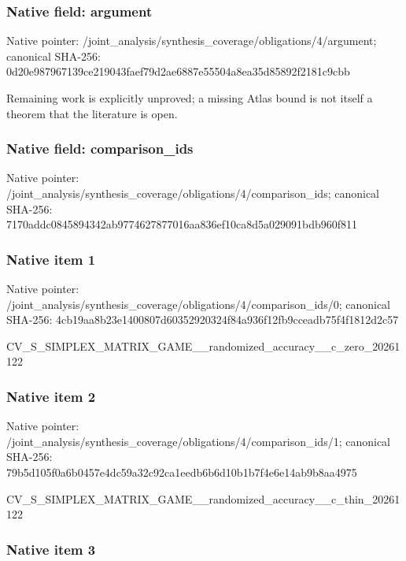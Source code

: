 \documentclass[10pt,a4paper]{article}
\begin{document}
\subsubsection{Native field: argument}


Native pointer: /joint\_analysis/synthesi\allowbreak{}s\_coverage/obligations/4\allowbreak{}/argument; canonical SHA-256: 0d20e987967139ce219043fa\allowbreak{}ef79d2ae6887e55504a8ea35\allowbreak{}d85892f2181c9cbb


Remaining work is explicitly unproved; a missing Atlas bound is not itself a theorem that the literature is open.


\subsubsection{Native field: comparison\_ids}


Native pointer: /joint\_analysis/synthesi\allowbreak{}s\_coverage/obligations/4\allowbreak{}/comparison\_ids; canonical SHA-256: 7170addc0845894342ab9774\allowbreak{}627877016aa836ef10ca8d5a\allowbreak{}029091bdb960f811



\subsubsection{Native item 1}


Native pointer: /joint\_analysis/synthesi\allowbreak{}s\_coverage/obligations/4\allowbreak{}/comparison\_ids/0; canonical SHA-256: 4cb19aa8b23e1400807d6035\allowbreak{}2920324f84a936f12fb9ccea\allowbreak{}db75f4f1812d2c57


CV\_S\_SIMPLEX\_MATRIX\_GAME\allowbreak{}\_\_randomized\_accuracy\_\_c\allowbreak{}\_zero\_20261122


\subsubsection{Native item 2}


Native pointer: /joint\_analysis/synthesi\allowbreak{}s\_coverage/obligations/4\allowbreak{}/comparison\_ids/1; canonical SHA-256: 79b5d105f0a6b0457e4dc59a\allowbreak{}32c92ca1eedb6b6d10b1b7f4\allowbreak{}e6e14ab9b8aa4975


CV\_S\_SIMPLEX\_MATRIX\_GAME\allowbreak{}\_\_randomized\_accuracy\_\_c\allowbreak{}\_thin\_20261122


\subsubsection{Native item 3}
\end{document}
